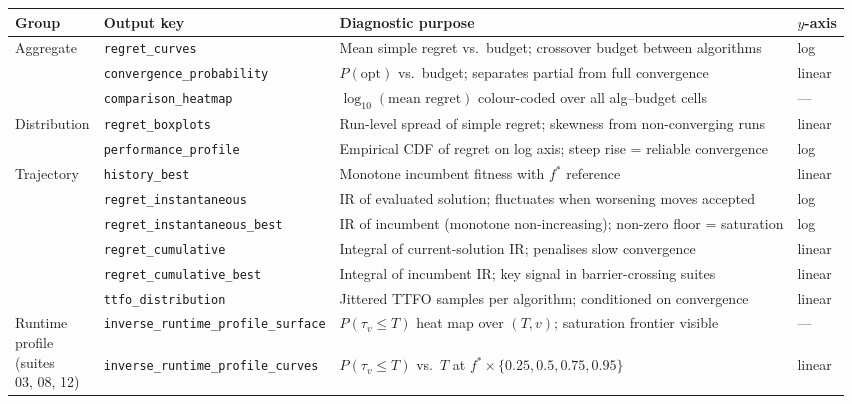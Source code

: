 \small
\begin{longtable}{@{}llp{4.6cm}l@{}}
  \toprule
  \textbf{Group} & \textbf{Output key} & \textbf{Diagnostic purpose}
  & \textbf{$y$-axis} \\
  \midrule
  \multirow{3}{*}{Aggregate}
  & \texttt{regret\_curves}          & Mean simple regret
  vs.\ budget; crossover budget between algorithms & log \\
  & \texttt{convergence\_probability}& $P(\text{opt})$ vs.\ budget;
  separates partial from full convergence & linear \\
  & \texttt{comparison\_heatmap}     & $\log_{10}(\text{mean
  regret})$ colour-coded over all alg--budget cells & --- \\
  \midrule
  \multirow{2}{*}{Distribution}
  & \texttt{regret\_boxplots}        & Run-level spread of simple
  regret; skewness from non-converging runs & linear \\
  & \texttt{performance\_profile}    & Empirical CDF of regret on log
  axis; steep rise = reliable convergence & log \\
  \midrule
  \multirow{5}{*}{Trajectory}
  & \texttt{history\_best}           & Monotone incumbent fitness
  with $f^{*}$ reference & linear \\
  & \texttt{regret\_instantaneous}   & IR of evaluated solution;
  fluctuates when worsening moves accepted & log \\
  & \texttt{regret\_instantaneous\_best} & IR of incumbent (monotone
  non-increasing); non-zero floor = saturation & log \\
  & \texttt{regret\_cumulative}      & Integral of current-solution
  IR; penalises slow convergence & linear \\
  & \texttt{regret\_cumulative\_best}& Integral of incumbent IR; key
  signal in barrier-crossing suites & linear \\
  & \texttt{ttfo\_distribution}      & Jittered TTFO samples per
  algorithm; conditioned on convergence & linear \\
  \midrule
  \multirow{3}{*}{\parbox{1.6cm}{Runtime\\profile\\(suites\\03, 08, 12)}}
  & \texttt{inverse\_runtime\_profile\_surface} & $P(\tau_v \leq T)$
  heat map over $(T,v)$; saturation frontier visible & --- \\
  & \texttt{inverse\_runtime\_profile\_curves}  & $P(\tau_v \leq T)$
  vs.\ $T$ at $f^{*}\times\{0.25,0.5,0.75,0.95\}$ & linear \\

\end{longtable}
